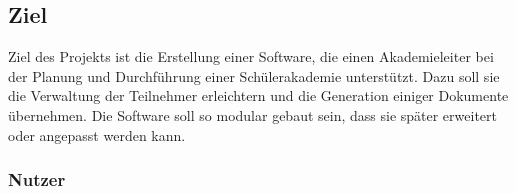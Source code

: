 \documentclass[a4paper]{scrartcl}
\begin{document}
	\subsection{Ziel}
	Ziel des Projekts ist die Erstellung einer Software, die einen Akademieleiter bei der Planung und Durchführung einer Schülerakademie unterstützt. Dazu soll sie die Verwaltung der Teilnehmer erleichtern und die Generation einiger Dokumente übernehmen. Die Software soll so modular gebaut sein, dass sie später erweitert oder angepasst werden kann.
	
	
	
	
	
	\subsubsection{Nutzer}
	
\end{document}
